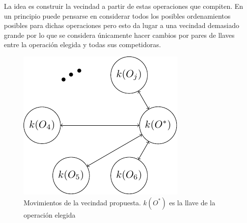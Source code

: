 La idea es construir la vecindad a partir de estas operaciones que compiten. En un principio puede pensarse en considerar todos los posibles ordenamientos posibles para dichas operaciones pero esto da lugar a una vecindad demasiado grande por lo que se considera únicamente hacer cambios por pares de llaves entre la operación elegida y todas sus competidoras.
\begin{figure}[H]
\centering
\includegraphics[scale=1.3]{Imagenes/vec2.pdf}
\caption{Movimientos de la vecindad propuesta. $k(O^*)$ es la llave de la operación elegida}
\end{figure}
